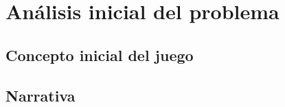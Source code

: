 \chapter{Análisis inicial del problema}
\label{ch:analisis}

\section{Concepto inicial del juego}

\section{Narrativa}
